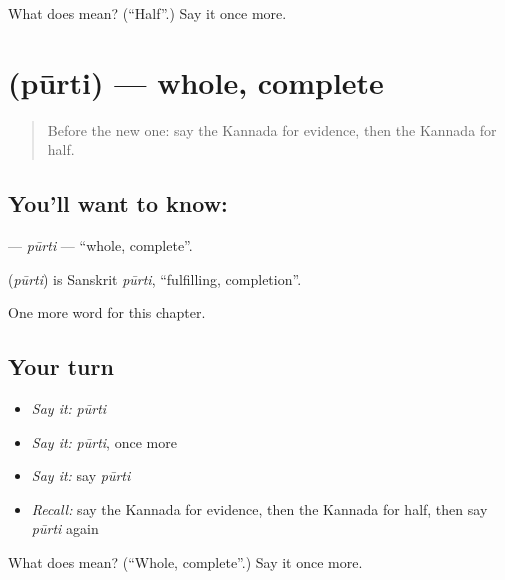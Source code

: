 \begin{tcolorbox}[breakable,colback=teal!4,colframe=teal!35!black,title={Before you move on}]
What does  mean? (\textquotedblleft{}Half\textquotedblright{}.) Say it once more.
\end{tcolorbox}
\section[\texorpdfstring{\kn{ಪೂರ್ತಿ} (pūrti)}{ಪೂರ್ತಿ (pūrti)}]{ (pūrti) — whole, complete}

\label{lesson:KA-C290-purti}



\begin{quote}
Before the new one: say the Kannada for evidence, then the Kannada for half.
\end{quote}

\subsection*{You'll want to know: }
\textbf{} — \emph{pūrti} — \textquotedblleft{}whole, complete\textquotedblright{}.

\begin{cousinweb}
\textbf{} (\emph{pūrti}) is Sanskrit \emph{pūrti}, \textquotedblleft{}fulfilling, completion\textquotedblright{}.
\end{cousinweb}

\begin{grammarlens}[title={What you've built}]
One more word for this chapter.
\end{grammarlens}

\subsection*{Your turn}
\begin{itemize}
\raggedright
  \item \emph{Say it:} \emph{pūrti}
  \item \emph{Say it:} \emph{pūrti}, once more
  \item \emph{Say it:} say \emph{pūrti}
  \item \emph{Recall:} say the Kannada for evidence, then the Kannada for half, then say \emph{pūrti} again
\end{itemize}

\begin{tcolorbox}[breakable,colback=teal!4,colframe=teal!35!black,title={Before you move on}]
What does  mean? (\textquotedblleft{}Whole, complete\textquotedblright{}.) Say it once more.
\end{tcolorbox}
